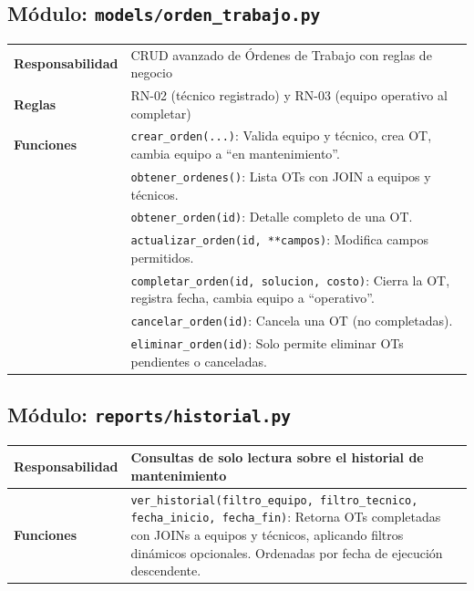 \documentclass[12pt, a4paper]{article}
\begin{document}
\subsection{Módulo: \texttt{models/orden\_trabajo.py}}

\begin{table}[H]
    \centering
    \begin{tabularx}{\textwidth}{l X}
        \toprule
        \textbf{Responsabilidad} & CRUD avanzado de Órdenes de Trabajo con reglas de negocio \\
        \textbf{Reglas} & RN-02 (técnico registrado) y RN-03 (equipo operativo al completar) \\
        \midrule
        \textbf{Funciones} & \texttt{crear\_orden(...)}: Valida equipo y técnico, crea OT, cambia equipo a ``en mantenimiento''. \\
        & \texttt{obtener\_ordenes()}: Lista OTs con JOIN a equipos y técnicos. \\
        & \texttt{obtener\_orden(id)}: Detalle completo de una OT. \\
        & \texttt{actualizar\_orden(id, **campos)}: Modifica campos permitidos. \\
        & \texttt{completar\_orden(id, solucion, costo)}: Cierra la OT, registra fecha, cambia equipo a ``operativo''. \\
        & \texttt{cancelar\_orden(id)}: Cancela una OT (no completadas). \\
        & \texttt{eliminar\_orden(id)}: Solo permite eliminar OTs pendientes o canceladas. \\
        \bottomrule
    \end{tabularx}
\end{table}

\subsection{Módulo: \texttt{reports/historial.py}}

\begin{table}[H]
    \centering
    \begin{tabularx}{\textwidth}{l X}
        \toprule
        \textbf{Responsabilidad} & Consultas de solo lectura sobre el historial de mantenimiento \\
        \midrule
        \textbf{Funciones} & \texttt{ver\_historial(filtro\_equipo, filtro\_tecnico, fecha\_inicio, fecha\_fin)}: Retorna OTs completadas con JOINs a equipos y técnicos, aplicando filtros dinámicos opcionales. Ordenadas por fecha de ejecución descendente. \\
        \bottomrule
    \end{tabularx}
\end{table}
\end{document}
